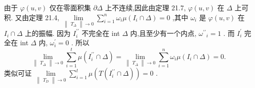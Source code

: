 由于 \(\varphi \left( {u,v}\right)\) 仅在零面积集 \(\partial \Delta\) 上不连续,因此由定理 21.7, \(\varphi \left( {u,v}\right)\) 在 \(\Delta\) 上可积. 又由定理 21.4, \(\mathop{\lim }\limits_{{\begin{Vmatrix}{T}_{\Delta }\end{Vmatrix} \rightarrow  0}}\mathop{\sum }\limits_{{i = 1}}^{n}{\omega }_{i}\mu \left( {{I}_{i} \cap  \Delta }\right)  = 0\) ,其中 \({\omega }_{i}\) 是 \(\varphi \left( {u,v}\right)\) 在 \({I}_{i} \cap  \Delta\) 上的振幅. 因为 \({I}_{i}^{\prime \prime }\) 不完全在 int \(\Delta\) 内,且至少有一个内点, \({\omega }^{\prime \prime }{}_{i} = 1\) . 而 \({I}_{i}^{\prime }\) 完全在 int \(\Delta\) 内, \({\omega }_{i}^{\prime } = 0\) . 所以
\[
\mathop{\lim }\limits_{{\begin{Vmatrix}{T}_{\Delta }\end{Vmatrix} \rightarrow  0}}\mathop{\sum }\limits_{{i = 1}}^{t}\mu \left( {{I}_{i}^{\prime \prime } \cap  \Delta }\right)  = \mathop{\lim }\limits_{{\begin{Vmatrix}{T}_{\Delta }\end{Vmatrix} \rightarrow  0}}\mathop{\sum }\limits_{{i = 1}}^{n}{\omega }_{i}\mu \left( {{I}_{i} \cap  \Delta }\right)  = 0.
\]
类似可证 \(\mathop{\lim }\limits_{{\begin{Vmatrix}{T}_{D}\end{Vmatrix} \rightarrow  0}}\mathop{\sum }\limits_{{i = 1}}^{t}\mu \left( {T\left( {{I}_{i}^{\prime \prime } \cap  \Delta }\right) }\right)  = 0\) .

